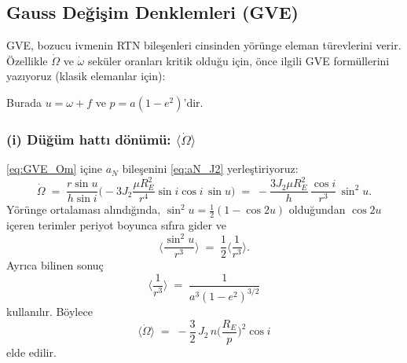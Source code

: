 \subsection{Gauss Değişim Denklemleri (GVE)}
\label{subsec:J2_GVE}

GVE, bozucu ivmenin RTN bileşenleri cinsinden yörünge eleman türevlerini verir. Özellikle $\dot\Omega$ ve
$\dot\omega$ seküler oranları kritik olduğu için, önce ilgili GVE formüllerini yazıyoruz (klasik elemanlar için):

{%
\setlength{\fboxsep}{6pt}%
\setlength{\fboxrule}{0.6pt}%
\begin{center}
%
\end{center}
}%

Burada $u=\omega+f$ ve $p=a(1-e^2)$’dir.



\subsubsection*{(i) Düğüm hattı dönümü: $\langle\dot\Omega\rangle$}

\eqref{eq:GVE_Om} içine $a_N$ bileşenini \eqref{eq:aN_J2} yerleştiriyoruz:
\[
\dot\Omega
\;=\;\frac{r\sin u}{h\sin i}\Bigg(-3J_2\frac{\mu R_E^2}{r^4}\sin i\cos i\,\sin u\Bigg)
\;=\; -\frac{3J_2\mu R_E^2}{h}\,\frac{\cos i}{r^3}\,\sin^2 u.
\]
Yörünge ortalaması alındığında,
$\sin^2 u = \tfrac12(1-\cos 2u)$ olduğundan $\cos 2u$ içeren terimler periyot boyunca
sıfıra gider ve
\[
\Big\langle \frac{\sin^2 u}{r^3}\Big\rangle
\;=\;\frac{1}{2}\Big\langle \frac{1}{r^3}\Big\rangle.
\]
Ayrıca bilinen sonuç
\[
\Big\langle \frac{1}{r^3}\Big\rangle
\;=\;\frac{1}{a^3(1-e^2)^{3/2}}
\]
kullanılır. Böylece
\begin{equation}
\boxed{
\big\langle \dot\Omega \big\rangle
\;=\; -\frac{3}{2}\,J_2\,n\Big(\frac{R_E}{p}\Big)^2\cos i
}
\label{eq:Omega_secular_J2}
\end{equation}
elde edilir.

